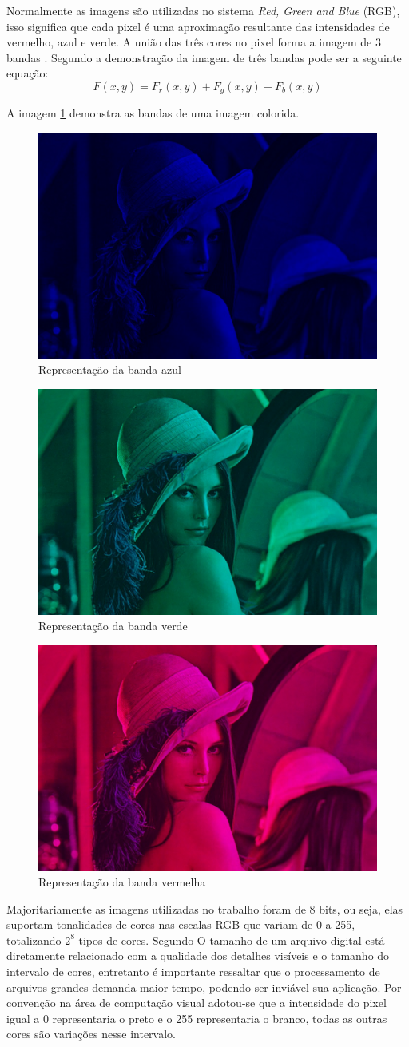 \documentclass[12pt]{article}
\begin{document}
	Normalmente as imagens são utilizadas no sistema \textit{Red, Green and Blue} (RGB), isso significa que cada pixel é uma aproximação resultante das intensidades de vermelho, azul e verde. A união das três cores no pixel forma a imagem de 3 bandas \citep{biasi2002desenvolvimento}. Segundo \cite{de2006introduccao} a demonstração da imagem de três bandas pode ser a seguinte equação:
	\begin{equation}
	F(x,y)=F_r(x,y)+F_g(x,y)+F_b(x,y)
	\end{equation}
	
	
	A imagem \ref{fig:blue} demonstra as bandas de uma imagem colorida.
	

\begin{figure}[h!]
	\centering
	\includegraphics[width=0.4\linewidth]{img/Blue}
	\caption{Representação da banda azul}
	\label{fig:blue}
\end{figure}
\begin{figure}[h!]
	\centering
	\includegraphics[width=0.4\linewidth]{img/gree}
	\caption{Representação da banda verde}
	\label{fig:gree}
\end{figure}
\begin{figure}[h!]
	\centering
	\includegraphics[width=0.4\linewidth]{img/Red}
	\caption{Representação da banda vermelha}
	\label{fig:red}
\end{figure}
	
	Majoritariamente as imagens utilizadas no trabalho foram de 8 bits, ou seja, elas suportam tonalidades de cores nas escalas RGB que variam de 0 a 255, totalizando $2^8$ tipos de cores. Segundo \cite{morgan2008tecnicas} O tamanho de um arquivo digital está diretamente relacionado com a qualidade dos detalhes visíveis e o tamanho do intervalo de cores, entretanto é importante ressaltar que o processamento de arquivos grandes demanda maior tempo, podendo ser inviável sua aplicação. Por convenção na área de computação visual adotou-se que a intensidade do pixel igual a 0 representaria o preto e o 255 representaria o branco, todas as outras cores são variações nesse intervalo. 
	
\end{document}
